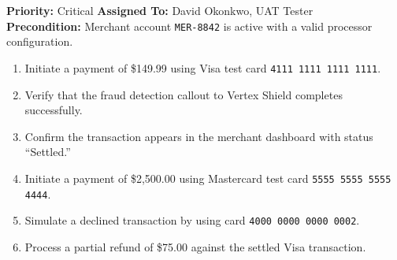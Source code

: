 \vspace{12pt}

\begin{tcolorbox}[
  enhanced,
  colback=white,
  colframe=accentBlue,
  boxrule=1pt,
  left=12pt,
  right=12pt,
  top=10pt,
  bottom=10pt,
  sharp corners,
  title={\textbf{TC-002: Credit Card Payment Processing}},
  fonttitle=\bfseries\color{white},
  colbacktitle=accentBlue
]
  \textbf{Priority:} Critical \hfill \textbf{Assigned To:} David Okonkwo, UAT Tester\\[4pt]
  \textbf{Precondition:} Merchant account \texttt{MER-8842} is active with a valid processor configuration.\\[4pt]

  \begin{tcolorbox}[
    enhanced,
    colback=bgLight,
    colframe=borderGray,
    boxrule=0.5pt,
    left=10pt,
    right=10pt,
    top=6pt,
    bottom=6pt,
    sharp corners,
    title={Test Steps},
    fonttitle=\bfseries\color{primaryNavy}
  ]
    \begin{enumerate}[nosep, leftmargin=*]
      \item Initiate a payment of \$149.99 using Visa test card \texttt{4111\,1111\,1111\,1111}.
      \item Verify that the fraud detection callout to Vertex Shield completes successfully.
      \item Confirm the transaction appears in the merchant dashboard with status ``Settled.''
      \item Initiate a payment of \$2,500.00 using Mastercard test card \texttt{5555\,5555\,5555\,4444}.
      \item Simulate a declined transaction by using card \texttt{4000\,0000\,0000\,0002}.
      \item Process a partial refund of \$75.00 against the settled Visa transaction.
    \end{enumerate}
  \end{tcolorbox}

  \vspace{4pt}


\end{tcolorbox}
